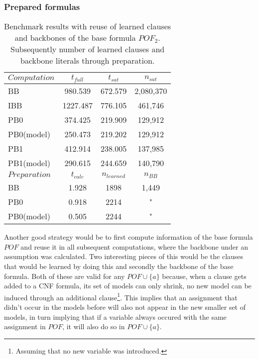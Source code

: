 \subsubsection{Prepared formulas}
\begin{wraptable}[20]{R}{8cm}
\begin{tabular}{l | c c c}
$Computation$ & $t_{full}$ & $t_{sat}$ & $n_{sat}$\\
\hline 
BB 			& 980.539 & 672.579 & 2,080,370 \\
IBB 		& 1227.487 & 776.105 &  461,746 \\
PB0 		& 374.425 & 219.909 &  129,912 \\
PB0(model) 	& 250.473 & 219.202 &  129,912 \\
PB1 		& 412.914 & 238.005 &  137,985 \\
PB1(model) 	& 290.615 & 244.659 & 140,790 \\

\hline \hline 
$Preparation$ & $t_{calc}$ & $n_{learned}$ & $n_{BB}$  \\
\hline
BB         & 1.928 & 1898 & 1,449 \\
PB0        & 0.918 & 2214 & " \\
PB0(model) & 0.505 & 2244 & " \\

\end{tabular}
\caption[Performance results with a prepared formula object]{Benchmark results with reuse of learned clauses and backbones of the base formula $POF_2$. Subsequently number of learned clauses and backbone literals through preparation.}
\label{tab:pofPrepBenefit}
\end{wraptable}
Another good strategy would be to first compute information of the base formula $POF$ and reuse it in all subsequent computations, where the backbone under an assumption was calculated. Two interesting pieces of this would be the clauses that would be learned by doing this and secondly the backbone of the base formula. Both of these are valid for any $POF \cup \{a\}$ because, when a clause gets added to a CNF formula, its set of models can only shrink, no new model can be induced through an additional clause\footnote{Assuming that no new variable was introduced.}. This implies that an assignment that didn't occur in the models before will also not appear in the new smaller set of models, in turn implying that if a variable always occured with the same assignment in $POF$, it will also do so in $POF \cup \{a\}$.


